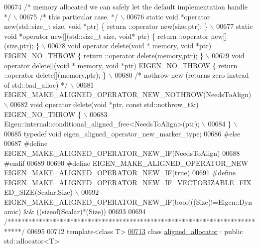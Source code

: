 \begin{DoxyCode}
00674 \textcolor{preprocessor}{      }\textcolor{comment}{/* memory allocated we can safely let the default implementation handle */}\textcolor{preprocessor}{ \(\backslash\)}
00675 \textcolor{preprocessor}{      }\textcolor{comment}{/* this particular case. */}\textcolor{preprocessor}{ \(\backslash\)}
00676 \textcolor{preprocessor}{      static void *operator new(std::size\_t size, void *ptr) \{ return ::operator new(size,ptr); \} \(\backslash\)}
00677 \textcolor{preprocessor}{      static void *operator new[](std::size\_t size, void* ptr) \{ return ::operator new[](size,ptr); \} \(\backslash\)}
00678 \textcolor{preprocessor}{      void operator delete(void * memory, void *ptr) EIGEN\_NO\_THROW \{ return ::operator delete(memory,ptr);
       \} \(\backslash\)}
00679 \textcolor{preprocessor}{      void operator delete[](void * memory, void *ptr) EIGEN\_NO\_THROW \{ return ::operator
       delete[](memory,ptr); \} \(\backslash\)}
00680 \textcolor{preprocessor}{      }\textcolor{comment}{/* nothrow-new (returns zero instead of std::bad\_alloc) */}\textcolor{preprocessor}{ \(\backslash\)}
00681 \textcolor{preprocessor}{      EIGEN\_MAKE\_ALIGNED\_OPERATOR\_NEW\_NOTHROW(NeedsToAlign) \(\backslash\)}
00682 \textcolor{preprocessor}{      void operator delete(void *ptr, const std::nothrow\_t&) EIGEN\_NO\_THROW \{ \(\backslash\)}
00683 \textcolor{preprocessor}{        Eigen::internal::conditional\_aligned\_free<NeedsToAlign>(ptr); \(\backslash\)}
00684 \textcolor{preprocessor}{      \} \(\backslash\)}
00685 \textcolor{preprocessor}{      typedef void eigen\_aligned\_operator\_new\_marker\_type;}
00686 \textcolor{preprocessor}{#else}
00687 \textcolor{preprocessor}{  #define EIGEN\_MAKE\_ALIGNED\_OPERATOR\_NEW\_IF(NeedsToAlign)}
00688 \textcolor{preprocessor}{#endif}
00689 
00690 \textcolor{preprocessor}{#define EIGEN\_MAKE\_ALIGNED\_OPERATOR\_NEW EIGEN\_MAKE\_ALIGNED\_OPERATOR\_NEW\_IF(true)}
00691 \textcolor{preprocessor}{#define EIGEN\_MAKE\_ALIGNED\_OPERATOR\_NEW\_IF\_VECTORIZABLE\_FIXED\_SIZE(Scalar,Size) \(\backslash\)}
00692 \textcolor{preprocessor}{  EIGEN\_MAKE\_ALIGNED\_OPERATOR\_NEW\_IF(bool(((Size)!=Eigen::Dynamic) &&
       ((sizeof(Scalar)*(Size))%
00693 
00694 \textcolor{comment}{/****************************************************************************/}
00695 
00712 \textcolor{keyword}{template}<\textcolor{keyword}{class} T>
\hyperlink{group___core___module}{00713} \textcolor{keyword}{class }\hyperlink{group___core___module_class_eigen_1_1aligned__allocator}{aligned\_allocator} : \textcolor{keyword}{public} std::allocator<T>
}
\end{DoxyCode}
